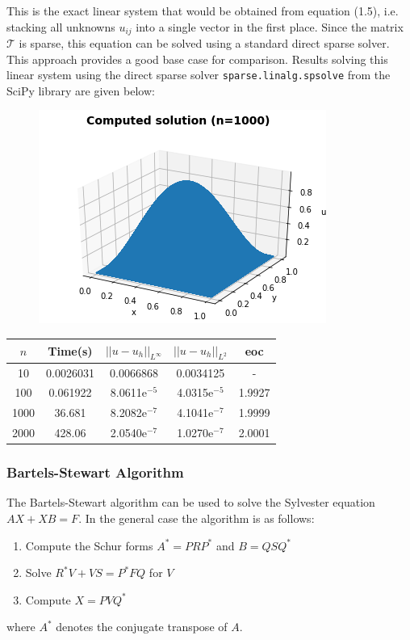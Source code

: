 \documentclass{article}
\numberwithin{equation}{section}
\begin{document}
This is the exact linear system that would be obtained from equation (1.5), i.e. stacking all unknowns $u_{ij}$ into a single vector in the first place. Since the matrix $\mathcal{T}$ is sparse, this equation can be solved using a standard direct sparse solver. This approach provides a good base case for comparison. Results solving this linear system using the direct sparse solver \texttt{sparse.linalg.spsolve} from the SciPy library are given below:

\begin{figure}[H]
\includegraphics[scale=.7]{img/U_sparse.png}
\centering
\end{figure}

\begin{table}[H]
\centering
\begin{tabular}{|c|c|c|c|c|}
\hline
$n$ & Time(s) & $|| u - u_h ||_{L^{\infty}}$ &$|| u - u_h ||_{L^{2}}$ & eoc \\
\hline
10 & 0.0026031 & 0.0066868 & 0.0034125 & - \\
100 & 0.061922 & 8.0611e$^{-5}$ & 4.0315e$^{-5}$ & 1.9927 \\
1000 & 36.681 & 8.2082e$^{-7}$ & 4.1041e$^{-7}$ & 1.9999  \\
2000 & 428.06 & 2.0540e$^{-7}$ & 1.0270e$^{-7}$ & 2.0001 \\
\hline
\end{tabular}
\end{table}

\subsubsection{Bartels-Stewart Algorithm}
The Bartels-Stewart algorithm \cite{Bartels} can be used to solve the Sylvester equation $AX + XB = F$. In the general case the algorithm is as follows:
\begin{enumerate}
\item Compute the Schur forms $A^* = PRP^*$ and $B=QSQ^*$
\item Solve $R^*V + VS = P^*FQ$ for $V$
\item Compute $X=PVQ^*$
\end{enumerate}
where $A^*$ denotes the conjugate transpose of $A$.
\end{document}
